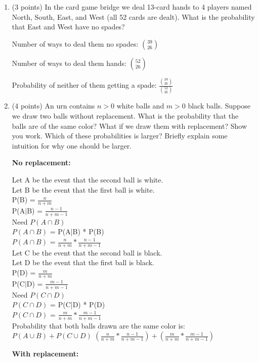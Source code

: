 \documentclass[11pt]{article}
\begin{document}
\begin{enumerate}

\item (3 points) In the card game bridge we deal 13-card hands to 4 players
named North, South, East, and West (all 52 cards are dealt).  What is the
probability that East and West have no spades?

Number of ways to deal them no spades: $\binom{39}{26}$

Number of ways to deal them hands: $\binom{52}{26}$

Probability of neither of them getting a spade: 
$\frac{\binom{39}{26}}{\binom{52}{26}}$

\item (4 points) An urn contains $n>0$ white balls and $m>0$ black balls.
Suppose we draw two balls without replacement.  What is the probability that
the balls are of the same color?  What if we draw them with replacement?  Show
you work.  Which of these probabilities is larger?  Briefly explain some
intuition for why one should be larger.

{\bf No replacement:}

	Let A be the event that the second ball is white. \\
	Let B be the event that the first ball is white. \\
	P(B) = $\frac{n}{n+m}$ \\
	P(A$|$B) = $\frac{n-1}{n+m-1}$ \\
	Need $P(A \cap B)$ \\
	$P(A \cap B)$ = P(A|B) * P(B) \\
	$P(A \cap B)$ = $\frac{n}{n+m} * \frac{n-1}{n+m-1}$ \\
	Let C be the event that the second ball is black. \\
	Let D be the event that the first ball is black. \\
	P(D) = $\frac{m}{n+m}$ \\
	P(C$|$D) = $\frac{m-1}{n+m-1}$ \\
	Need $P(C \cap D)$ \\
	$P(C \cap D)$ = P(C|D) * P(D) \\
	$P(C \cap D)$ = $\frac{m}{n+m} * \frac{m-1}{n+m-1}$ \\
	Probability that both balls drawn are the same color is: \\
	$P(A \cup B) + P(C \cup D)$
	$(\frac{n}{n+m} * \frac{n-1}{n+m-1}) + 
	(\frac{m}{n+m} * \frac{m-1}{n+m-1})$

{\bf With replacement:}


\end{enumerate}
\end{document}
